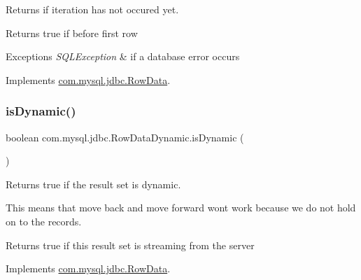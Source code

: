 Returns if iteration has not occured yet.

\begin{DoxyReturn}{Returns}
true if before first row 
\end{DoxyReturn}

\begin{DoxyExceptions}{Exceptions}
{\em S\+Q\+L\+Exception} & if a database error occurs \\
\hline
\end{DoxyExceptions}


Implements \mbox{\hyperlink{interfacecom_1_1mysql_1_1jdbc_1_1_row_data_ae315d5317b29387492173d1e808b65d5}{com.\+mysql.\+jdbc.\+Row\+Data}}.

\mbox{\label{classcom_1_1mysql_1_1jdbc_1_1_row_data_dynamic_a82708299ee9a3ef5ebcab85a59ba9c70}} 
\subsubsection{\texorpdfstring{is\+Dynamic()}{isDynamic()}}
{\footnotesize\ttfamily boolean com.\+mysql.\+jdbc.\+Row\+Data\+Dynamic.\+is\+Dynamic (\begin{DoxyParamCaption}{ }\end{DoxyParamCaption})}

Returns true if the result set is dynamic.

This means that move back and move forward won\textquotesingle{}t work because we do not hold on to the records.

\begin{DoxyReturn}{Returns}
true if this result set is streaming from the server 
\end{DoxyReturn}


Implements \mbox{\hyperlink{interfacecom_1_1mysql_1_1jdbc_1_1_row_data_a0205c4297c795afb968d714a56272e01}{com.\+mysql.\+jdbc.\+Row\+Data}}.

\mbox{\label{classcom_1_1mysql_1_1jdbc_1_1_row_data_dynamic_ae6bd51c674ff4442a649d4c3606d1aa6}} 
